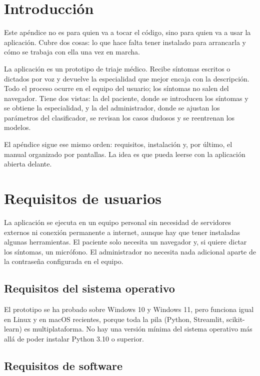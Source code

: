 
\section{Introducción}

Este apéndice no es para quien va a tocar el código, sino para quien va a usar la aplicación. Cubre dos cosas: lo que hace falta tener instalado para arrancarla y cómo se trabaja con ella una vez en marcha.

La aplicación es un prototipo de triaje médico. Recibe síntomas escritos o dictados por voz y devuelve la especialidad que mejor encaja con la descripción. Todo el proceso ocurre en el equipo del usuario; los síntomas no salen del navegador. Tiene dos vistas: la del paciente, donde se introducen los síntomas y se obtiene la especialidad, y la del administrador, donde se ajustan los parámetros del clasificador, se revisan los casos dudosos y se reentrenan los modelos.

El apéndice sigue ese mismo orden: requisitos, instalación y, por último, el manual organizado por pantallas. La idea es que pueda leerse con la aplicación abierta delante.

\section{Requisitos de usuarios}

La aplicación se ejecuta en un equipo personal sin necesidad de servidores externos ni conexión permanente a internet, aunque hay que tener instaladas algunas herramientas. El paciente solo necesita un navegador y, si quiere dictar los síntomas, un micrófono. El administrador no necesita nada adicional aparte de la contraseña configurada en el equipo.

\subsection*{Requisitos del sistema operativo}

El prototipo se ha probado sobre Windows 10 y Windows 11, pero funciona igual en Linux y en macOS recientes, porque toda la pila (Python, Streamlit, scikit-learn) es multiplataforma. No hay una versión mínima del sistema operativo más allá de poder instalar Python 3.10 o superior.

\subsection*{Requisitos de software}

